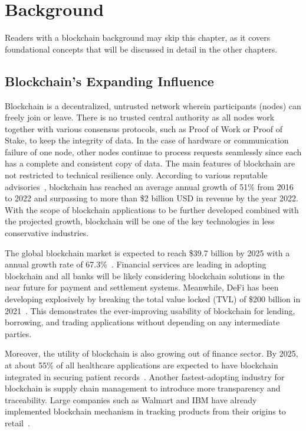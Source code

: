 
\chapter{Background}\label{ch:background}
Readers with a blockchain background may skip this chapter, as it covers foundational concepts that will be discussed in detail in the other chapters.

\section{Blockchain's Expanding Influence}
Blockchain is a decentralized, untrusted network wherein participants (nodes) can freely join or leave. There is no trusted central authority as all nodes work together with various consensus protocols, such as Proof of Work or Proof of Stake, to keep the integrity of data. In the case of hardware or communication failure of one node, other nodes continue to process requests seamlessly since each has a complete and consistent copy of data. The main features of blockchain are not restricted to technical resilience only. According to various reputable advisories~\cite{Gartner,Reportlinker}, blockchain has reached an average annual growth of 51\% from 2016 to 2022 and surpassing to more than \$2 billion USD in revenue by the year 2022. With the scope of blockchain applications to be further developed combined with the projected growth, blockchain will be one of the key technologies in less conservative industries.

The global blockchain market is expected to reach \$39.7 billion by 2025 with a annual growth rate of 67.3\%~\cite{GrandViewResearch2020}. Financial services are leading in adopting blockchain and all banks will be likely considering blockchain solutions in the near future for payment and settlement systems. Meanwhile, DeFi has been developing explosively by breaking the total value locked (TVL) of \$200 billion in 2021~\cite{MarketsandMarkets2020}. This demonstrates the ever-improving usability of blockchain for lending, borrowing, and trading applications without depending on any intermediate parties.

Moreover, the utility of blockchain is also growing out of finance sector. By 2025, at about 55\% of all healthcare applications are expected to have blockchain integrated in securing patient records~\cite{XcubeLabs2020}. Another fastest-adopting industry for blockchain is supply chain management to introduce more transparency and traceability. Large companies such as Walmart and IBM have already implemented blockchain mechanism in tracking products from their origins to retail~\cite{Sristy2021}.

